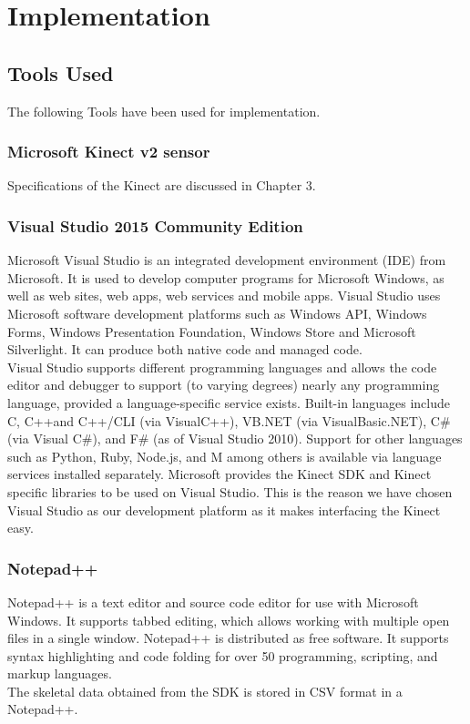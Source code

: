
\chapter{Implementation} \label{Implementation}

\section{Tools Used } \label{Tools Used }
\noindent The following Tools have been used for implementation.
\subsection{Microsoft Kinect v2 sensor} \label{Microsoft Kinect v2 sensor} 
\noindent Specifications of the Kinect are discussed in Chapter 3.
\subsection{Visual Studio 2015 Community Edition }\label{Visual Studio 2015 Community Edition }  
\noindent Microsoft Visual Studio is an integrated development environment (IDE) from Microsoft. It is used to develop computer programs for Microsoft Windows, as well as web sites, web apps, web services and mobile apps. Visual Studio uses Microsoft software development platforms such as Windows API, Windows Forms, Windows Presentation Foundation, Windows Store and Microsoft Silverlight. It can produce both native code and managed code.\\
\noindent Visual Studio supports different programming languages and allows the code editor and debugger to support (to varying degrees) nearly any programming language, provided a language-specific service exists. Built-in languages include C, C++and C++/CLI (via VisualC++), VB.NET (via VisualBasic.NET), C\# (via Visual C\#), and F\# (as of Visual Studio 2010). Support for other languages such as Python, Ruby, Node.js, and M among others is available via language services installed separately.
\noindent Microsoft provides the Kinect SDK and Kinect specific libraries to be used on Visual Studio. This is the reason we have chosen Visual Studio as our development platform as it makes interfacing the Kinect easy.   
\subsection{Notepad++ }\label{Notepad++ } 
\noindent Notepad++ is a text editor and source code editor for use with Microsoft Windows. It supports tabbed editing, which allows working with multiple open files in a single window. Notepad++ is distributed as free software. It supports syntax highlighting and code folding for over 50 programming, scripting, and markup languages.\\
The skeletal data obtained from the SDK is stored in CSV format in a Notepad++.

